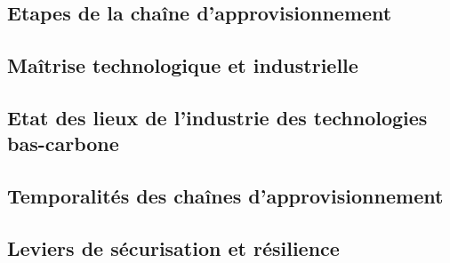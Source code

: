 \documentclass{article}
\begin{document}
\subsection{Etapes de la chaîne d'approvisionnement}
\label{section:chaine}

\clearpage
\printbibliography
\clearpage
\clearpage
\begin{refsection}
\section{Maîtrise technologique et industrielle}
    
    \newpage
    \subsection{Etat des lieux de l'industrie des technologies bas-carbone}
    \label{section:etat_des_lieux}
    
    \subsection{Temporalités des chaînes d'approvisionnement}
    \label{section:temporalité}
    
    \subsection{Leviers de sécurisation et résilience}
    \label{section:levier}
    
    \clearpage
    \clearpage
    \printbibliography
    \clearpage
\end{refsection}
\newpage
\end{document}
